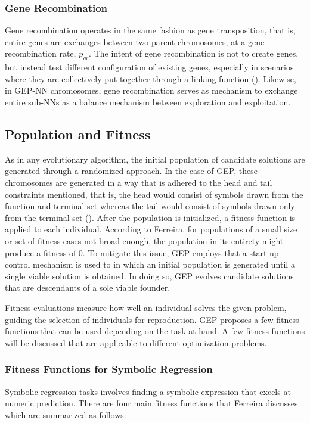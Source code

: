\subsubsection{Gene Recombination}
Gene recombination operates in the same fashion as gene transposition, that is, entire genes are exchanges between two parent chromosomes, at a gene recombination rate, \textit{$p_{gr}$}. The intent of gene recombination is not to create genes, but instead test different configuration of existing genes, especially in scenarios where they are collectively put together through a linking function (\cite{ferreira2006gene}). Likewise, in GEP-NN chromosomes, gene recombination serves as mechanism to exchange entire sub-NNs as a balance mechanism between exploration and exploitation.

\subsection{Population and Fitness}
As in any evolutionary algorithm, the initial population of candidate solutions are generated through a randomized approach. In the case of GEP, these chromosomes are generated in a way that is adhered to the head and tail constraints mentioned, that is, the head would consist of symbols drawn from the function and terminal set whereas the tail would consist of symbols drawn only from the terminal set (\cite{ferreira2006gene}). After the population is initialized, a fitness function is applied to each individual. According to Ferreira, for populations of a small size or set of fitness cases not broad enough, the population in its entirety might produce a fitness of 0. To mitigate this issue, GEP employs that a start-up control mechanism is used to in which an initial population is generated until a single viable solution is obtained. In doing so, GEP evolves candidate solutions that are descendants of a sole viable founder. \bigskip

\noindent Fitness evaluations measure how well an individual solves the given problem, guiding the selection of individuals for reproduction. GEP proposes a few fitness functions that can be used depending on the task at hand. A few fitness functions will be discussed that are applicable to different optimization problems.

\subsubsection{Fitness Functions for Symbolic Regression}
Symbolic regression tasks involves finding a symbolic expression that excels at numeric prediction. There are four main fitness functions that Ferreira discusses which are summarized as follows:

